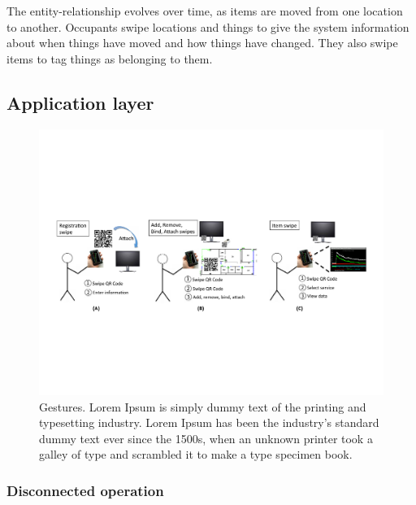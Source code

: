 The entity-relationship evolves over time, as items are moved from one location to another.  Occupants swipe
locations and things to give the system information about when things have moved and how things have changed.
They also swipe items to tag things as belonging to them.








\subsection{Application layer}

\begin{figure}[htb!]
\begin{center}
\includegraphics[width=\textwidth]{figs/swipes}
\caption{Gestures. Lorem Ipsum is simply dummy text of the printing and typesetting industry. Lorem Ipsum has 
been the industry's standard dummy text ever since the 1500s, when an unknown printer took a galley of 
type and scrambled it to make a type specimen book.  }
\label{fig:gestures}
\end{center}
\end{figure}

\subsubsection{Disconnected operation}


